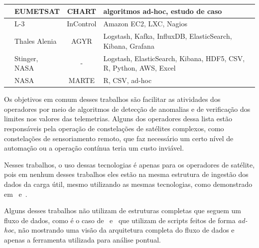 \begin{table}[htbp]
\begin{center}
\begin{tabular}{|C{8em}|C{6em}|c|C{10em}|}
			\hline
			\cite{trollopeAnalysisAutomatedTechniques2018} & EUMETSAT           & CHART                & algoritmos ad-hoc, estudo de caso                                                    \\
			\hline
			\cite{gillesFlyingLargeConstellations2016}     & L-3                & InControl            & Amazon EC2, LXC, Nagios                                                              \\
			\hline
			\cite{hennionBigdataSatelliteYearly2018}       & Thales Alenia      & AGYR                 & Logstash, Kafka, InfluxDB, ElasticSearch, Kibana, Grafana                            \\
			\hline
			\cite{mateikUsingBigData2017}                  & Stinger, NASA      & -                    & Logstash, ElasticSearch, Kibana, HDF5, CSV, R, Python, AWS, Excel                    \\
			\hline
			\cite{fernandezTelemetryAnomalyDetection2017}  & NASA               & MARTE                & R, CSV, ad-hoc                                                                       \\
			\hline
		\end{tabular}
	\end{center}
\end{table}

Os objetivos em comum desses trabalhos são facilitar as atividades dos operadores por meio de algoritmos de detecção de anomalias e de verificação dos limites nos valores das telemetrias.
Alguns dos operadores dessa lista estão responsáveis pela operação de constelações de satélites complexos, como constelações de sensoriamento remoto, que faz necessário um certo nível de automação ou a operação contínua teria um custo inviável.

Nesses trabalhos, o uso dessas tecnologias é apenas para os operadores de satélite, pois em nenhum desses trabalhos eles estão na mesma estrutura de ingestão dos dados da carga útil, mesmo utilizando as mesmas tecnologias, como demonstrado em~\cite{mateikUsingBigData2017} e~\cite{adamskiDataAnalyticsLarge2016}.

Alguns desses trabalhos não utilizam de estruturas completas que seguem um fluxo de dados, como é o caso de~\cite{fernandezTelemetryAnomalyDetection2017} e~\cite{trollopeAnalysisAutomatedTechniques2018} que utilizam de scripts feitos de forma \textit{ad-hoc}, não mostrando uma visão da arquitetura completa do fluxo de dados e apenas a ferramenta utilizada para análise pontual.

